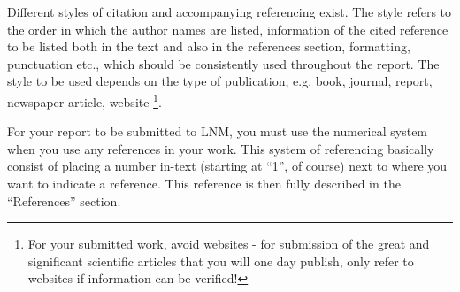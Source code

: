 \documentclass[../main.tex]{subfiles}
\begin{document}
Different styles of citation and accompanying referencing exist. The style refers to the order in which the author names are listed, information of the cited reference to be listed both in the text and also in the references section, formatting, punctuation etc., which should be consistently used throughout the report. The style to be used depends on the type of publication, e.g. book, journal, report, newspaper article, website%
\footnote{For your submitted work, avoid websites - for submission of the great and significant scientific articles that you will one day publish, only refer to websites if
information can be verified!%
}.

For your report to be submitted to LNM, you must use the numerical system when you use
any references in your work. This system of referencing basically
consist of placing a number in-text (starting at \textquotedblleft{}1\textquotedblright{},
of course) next to where you want to indicate a reference.  This reference
is then fully described in the \textquotedblleft{}References\textquotedblright{}
section. 
\end{document}
